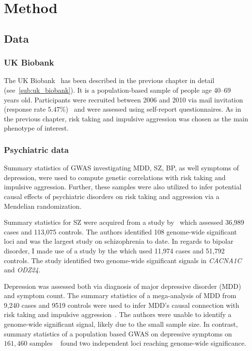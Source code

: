 \section{Method}
\label{sec:method_psych}

\subsection{Data}
\label{sub:data}

\subsubsection{UK Biobank}
\label{ssub:uk_biobank_psych}

The UK Biobank~\cite{Allen2014} has been described in the previous chapter in detail (see~\ref{sub:uk_biobank}).
It is a population-based sample of people age 40--69 years old. 
Participants were recruited between 2006 and 2010 via mail invitation (response rate $5.47\%$)~\cite{Sudlow2015} and were assessed using self-report questionnaires.
As in the previous chapter, risk taking and impulsive aggression was chosen as the main phenotype of interest.

\subsubsection{Psychiatric data}
\label{ssub:psychiatric_data}

Summary statistics of GWAS investigating MDD, SZ, BP, as well symptoms of depression, were used to compute genetic correlations with risk taking and impulsive aggression.
Further, these samples were also utilized to infer potential causal effects of psychiatric disorders on risk taking and aggression via a Mendelian randomization.

Summary statistics for SZ were acquired from a study by~\citet{Ripke2014} which assessed 36,989 cases and 113,075 controls.
The authors identified 108 genome-wide significant loci and was the largest study on schizophrenia to date.
In regards to bipolar disorder, I made use of a study by the \citet{PsychiatricGWASConsortiumBipolarDisorderWorkingGroup2011} which used 11,974 cases and 51,792 controls.
The study identified two genome-wide significant signals in \textit{CACNA1C} and \textit{ODZ24}.

Depression was assessed both via diagnosis of major depressive disorder (MDD) and symptom count. 
The summary statistics of a mega-analysis of MDD from 9,240 cases and 9519 controls were used to infer MDD's causal connection with risk taking and impulsive aggression~\cite{MajorDepressiveDisorderWorkingGroupofthePsychiatricGWASConsortium2013}.
The authors were unable to identify a genome-wide significant signal, likely due to the small sample size.
In contrast, summary statistics of a population based GWAS on depressive symptoms on $161,460$ samples ~\cite{Okbay2016} found two independent loci reaching genome-wide significance.  

